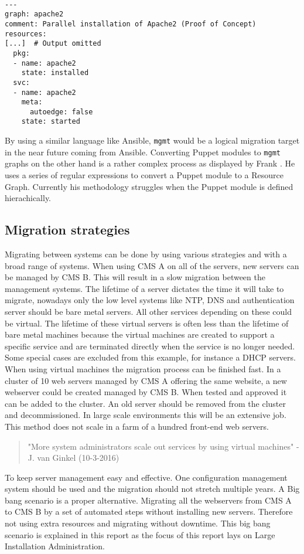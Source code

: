 \\
\begin{lstlisting}[caption={Snippet of Resource Graph Definition},label=lst:resgraph]
---
graph: apache2
comment: Parallel installation of Apache2 (Proof of Concept)
resources:
[...]  # Output omitted
  pkg:
  - name: apache2
    state: installed
  svc:
  - name: apache2
    meta:
      autoedge: false
    state: started
\end{lstlisting}
\noindent
By using a similar language like Ansible, \texttt{mgmt} would be a logical migration target in the near future coming from Ansible. Converting Puppet modules to \texttt{mgmt} graphs on the other hand is a rather complex process as displayed by Frank \cite{frank_2016}. He uses a series of regular expressions to convert a Puppet module to a Resource Graph. Currently his methodology struggles when the Puppet module is defined hierachically.

\subsection{Migration strategies}\label{subsec:migrationstrategies}
Migrating between systems can be done by using various strategies and with a broad range of systems. When using CMS A on all of the servers, new servers can be managed by CMS B. This will result in a slow migration between the management systems. The lifetime of a server dictates the time it will take to migrate, nowadays only the low level systems like NTP, DNS and authentication server should be bare metal servers. All other services depending on these could be virtual. The lifetime of these virtual servers is often less than the lifetime of bare metal machines because the virtual machines are created to support a specific service and are terminated directly when the service is no longer needed. Some special cases are excluded from this example, for instance a DHCP servers. When using virtual machines the migration process can be finished fast. In a cluster of 10 web servers managed by CMS A offering the same website, a new webserver could be created managed by CMS B. When tested and approved it can be added to the cluster. An old server should be removed from the cluster and decommissioned. In large scale environments this will be an extensive job. This method does not scale in a farm of a hundred front-end web servers.

\begin{quote}
\label{quote}
"More system administrators scale out services by using virtual machines" - J. van Ginkel (10-3-2016)
\end{quote}

To keep server management easy and effective. One configuration management system should be used and the migration should not stretch multiple years. A Big bang scenario is a proper alternative. Migrating all the webservers from CMS A to CMS B by a set of automated steps without installing new servers. Therefore not using extra resources and migrating without downtime. This big bang scenario \cite{bigbang} is explained in this report as the focus of this report lays on Large Installation Administration.

